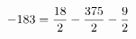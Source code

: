 \documentclass[preview]{standalone}
\begin{document}
\begin{align*}
\special{dvisvgm:raw <g id='unique000'>}-183 = \frac{18}{2} - \frac{375}{2} - \frac{9}{2}\special{dvisvgm:raw </g>}
\end{align*}
\end{document}
